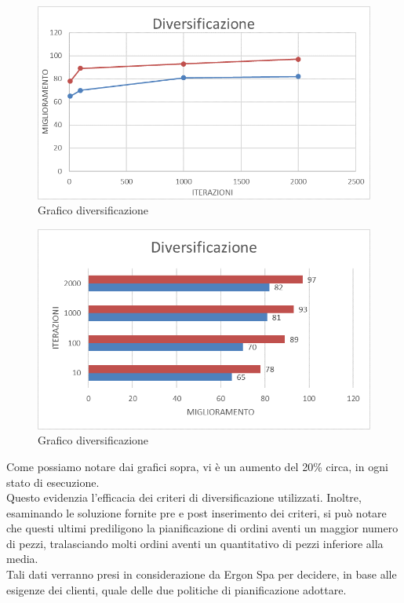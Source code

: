 \begin{figure}[H]
	\includegraphics[width=13cm]{immagini/diversificazione.png}
	\centering
	\caption{Grafico diversificazione}
\end{figure}

\begin{figure}[H]
	\includegraphics[width=13cm]{immagini/diversificazione2.png}
	\centering
	\caption{Grafico diversificazione}
\end{figure}

Come possiamo notare dai grafici sopra, vi è un aumento del 20\% circa, in ogni stato di esecuzione.\\ Questo evidenzia l'efficacia dei criteri di diversificazione utilizzati.
Inoltre, esaminando le soluzione fornite pre e post inserimento dei criteri, si può notare che questi ultimi prediligono la pianificazione di ordini aventi un maggior numero
di pezzi, tralasciando molti ordini aventi un quantitativo di pezzi inferiore alla media. \\Tali dati verranno presi in considerazione da Ergon Spa per decidere, in base
alle esigenze dei clienti, quale delle due politiche di pianificazione adottare.
